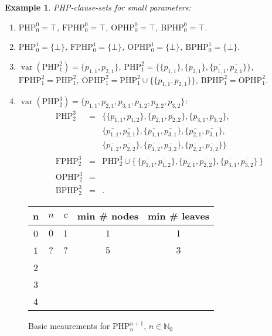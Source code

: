 \documentclass{report}
\newtheorem{examp}[defi]{Example}
\newcommand{\set}[1]{\{ #1 \}}
\newcommand{\setb}[1]{\big \{ \, #1 \, \big \}}
\newcommand{\ol}{\overline}
\newcommand{\NN}{\mathbb{N}}
\newcommand{\NNZ}{\NN_0}
\DeclareMathOperator{\var}{var}
\newcommand{\php}{\mathrm{PHP}}
\newcommand{\fphp}{\mathrm{FPHP}} %
\newcommand{\ophp}{\mathrm{OPHP}} %
\newcommand{\ofphp}{\mathrm{BPHP}} %
\begin{document}
\begin{examp}\label{exp:PHPdef}
  PHP-clause-sets for small parameters:
  \begin{enumerate}
  \item $\php^0_0 = \top$, $\fphp^0_0 = \top$, $\ophp^0_0 = \top$, $\ofphp^0_0 = \top$.
  \item $\php^1_0 = \set{\bot}$, $\fphp^1_0 = \set{\bot}$, $\ophp^1_0 = \set{\bot}$, $\ofphp^1_0 = \set{\bot}$.
  \item $\var(\php^2_1) = \set{p_{1,1},p_{2,1}}$, $\php^2_1 = \set{\set{p_{1,1}}, \set{p_{2,1}}, \set{\ol{p_{1,1}},\ol{p_{2,1}}}}$, $\fphp^2_1 = \php^2_1$, $\ophp^2_1 = \php^2_1 \cup \set{\set{p_{1,1},p_{2,1}}}$, $\ofphp^2_1 = \ophp^2_1$.
  \item $\var(\php^3_2) = \set{p_{1,1},p_{2,1},p_{3,1},p_{1,2},p_{2,2},p_{3,2}}$:
    \begin{eqnarray*}
      \php^3_2 & = & \set{\set{p_{1,1},p_{1,2}},\set{p_{2,1},p_{2,2}},\set{p_{3,1},p_{3,2}},
      \\
      && \set{\ol{p_{1,1}},\ol{p_{2,1}}},\set{\ol{p_{1,1}},\ol{p_{3,1}}},\set{\ol{p_{2,1}},\ol{p_{3,1}}},
      \\
      && \set{\ol{p_{1,2}},\ol{p_{2,2}}},\set{\ol{p_{1,2}},\ol{p_{3,2}}},\set{\ol{p_{2,2}},\ol{p_{3,2}}} }\\
    \fphp^3_2 & = & \php^3_2 \cup \setb{ \set{\ol{p_{1,1}},\ol{p_{1,2}}},\set{\ol{p_{2,1}},\ol{p_{2,2}}},\set{\ol{p_{3,1}},\ol{p_{3,2}}} }
\\
      \ophp^3_2 & = &\\
      \ofphp^3_2 & = &.
    \end{eqnarray*}
  \end{enumerate}
\end{examp}

\begin{figure}[h]
  \centering
  \begin{tabular}{c|c|c|c|c}
    \hline
    n & $n$ &  $c$ & min \# nodes & min \# leaves \\ \hline
    0 & $0$ & $1$ & $1$ & $1$\\ \hline
    1 & $?$ & $?$ & $5$ & $3$    \\ \hline
    2 &                 &        \\ \hline
    3 &                 &        \\ \hline
    4 &                 &        \\ \hline
    \end{tabular}
  \caption{Basic meaurements for $\php^{n+1}_n$, $n \in \NNZ$}
  \label{fig:basicmeasurement}
\end{figure}
\end{document}
